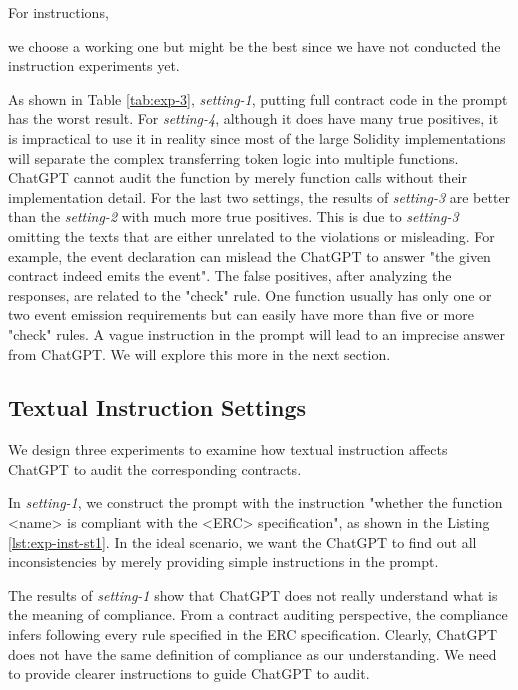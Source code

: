 For instructions, {\color{red}we choose a working one but might be the best since we have not conducted the instruction experiments yet.

As shown in Table \ref{tab:exp-3}, \textit{setting-1}, putting full contract code in the prompt has the worst result.  For \textit{setting-4}, although it does have many true positives, it is impractical to use it in reality since most of the large Solidity implementations will separate the complex transferring token logic into multiple functions. ChatGPT cannot audit the function by merely function calls without their implementation detail. For the last two settings, the results of \textit{setting-3} are better than the \textit{setting-2} with much more true positives. This is due to \textit{setting-3} omitting the texts that are either  unrelated to the violations or misleading. For example, the event declaration can mislead the ChatGPT to answer "the given contract indeed emits the event". The false positives, after analyzing the responses, are related to the "check" rule. One function usually has only one or two event emission requirements but can easily have more than five or more "check" rules. A vague instruction in the prompt will lead to an imprecise answer from ChatGPT. We will explore this more in the next section.
}




\subsection{Textual Instruction Settings}
We design three experiments to examine how textual instruction affects ChatGPT to audit the corresponding contracts.





In \textit{setting-1}, we construct the prompt with the instruction "whether the function <name> is compliant with the <ERC> specification", as shown in the Listing \ref{lst:exp-inst-st1}. In the ideal scenario, we want the ChatGPT to find out all inconsistencies by merely providing simple instructions in the prompt.

{
    \color{red} The results of \textit{setting-1} show that ChatGPT does not really understand what is the meaning of compliance. From a contract auditing perspective, the compliance infers following every rule specified in the ERC specification. Clearly, ChatGPT does not have the same definition of compliance as our understanding. We need to provide clearer instructions to guide ChatGPT to audit.
}

